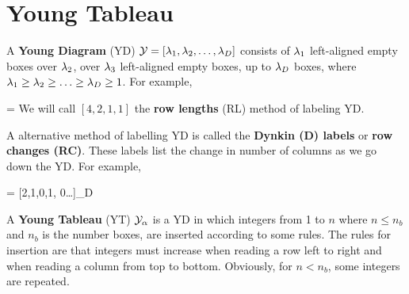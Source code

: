 \chapter{Young Tableau}
\label{ch-young-tableau}

A {\bf Young Diagram} (YD) ${\cal Y}=[\lambda_1, \lambda_2, \ldots, \lambda_D]$ 
consists of $\lambda_1$ left-aligned empty boxes
over $\lambda_2$, over 
$\lambda_3$ left-aligned empty boxes, up to
$\lambda_D$ boxes,
where $\lambda_1\geq \lambda_2\geq \ldots\geq \lambda_D\geq 1$.
For example,

\beq
[4, 2,1,1]=
\eeq
We will call $[4, 2,1,1]$ the
{\bf row lengths} (RL) method 
of labeling YD.

A alternative method of labelling YD is called the {\bf Dynkin (D) labels} 
or {\bf row changes (RC)}.
These labels list the change in number of columns as 
we go down the YD.
For example,

\beq
{}
=
[2,1,0,1, 0\ldots]_{D}
\eeq



A {\bf Young Tableau} (YT)
${\cal Y}_\alpha$ is a YD in which integers from 1 to $n$ where $n\leq n_b$ and $n_b$ is the number boxes, are inserted according to some rules. The rules for insertion are that integers must increase when reading a row  left to right and
when reading a column from top to bottom. Obviously, for $n<n_b$, some integers are repeated.


